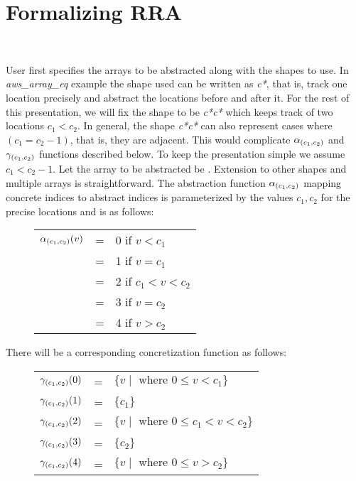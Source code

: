 \section{Formalizing RRA}~\label{sec:rra}

User first specifies the arrays to be abstracted along with the shapes
to use. In \emph{aws\_array\_eq} example the shape used can be written
as {\it *c*}, that is, track one location precisely and abstract the
locations before and after it. For the rest of this presentation, we
will fix the shape to be {\it *c*c*} which keeps track of two locations
\(c_1 < c_2\). In general, the shape  {\it *c*c*} can also represent
cases where \((c_1 = c_2 - 1)\), that is, they are adjacent. This
would complicate \(\alpha_{(c_1,c_2)}\) and \(\gamma_{(c_1,c_2)}\) functions described
below. To keep the presentation simple we assume \(c_1 < c_2 -
1\). Let the array to be abstracted be \aid. Extension to other
shapes and multiple arrays is straightforward. The abstraction
function \(\alpha_{(c_1,c_2)}\) mapping concrete indices to abstract indices is
parameterized by the values \(c_1, c_2\) for the precise locations and
is as follows:

\begin{figure}[H]
  \centering
  \begin{tabular}{ccl}
    \(\alpha_{(c_1,c_2)}(v)\) & = & 0 if \(v < c_1\) \\
    &=& 1 if \(v = c_1\) \\
    &=& 2 if \(c_1 < v < c_2\) \\
    &=& 3 if \(v = c_2\) \\
    &=& 4 if \(v > c_2\)
    \end{tabular}
\end{figure}

There will be a corresponding concretization function as follows:

\begin{figure}[H]
  \centering
  \begin{tabular}{ccl}
    \(\gamma_{(c_1,c_2)}(0)\)  &=& \(\{v \mid \mbox{ where } 0 \leq  v < c_1\}\) \\
    \(\gamma_{(c_1,c_2)}(1)\)  &=& \(\{c_1\}\) \\
     \(\gamma_{(c_1,c_2)}(2)\) &=& \(\{v \mid \mbox{ where } 0 \leq  c_1 < v < c_2\}\) \\ 
    \(\gamma_{(c_1,c_2)}(3)\)  &=& \(\{c_2\}\) \\
     \(\gamma_{(c_1,c_2)}(4)\) &=& \(\{v \mid \mbox{ where } 0 \leq  v > c_2\}\)
    \end{tabular}
\end{figure}

